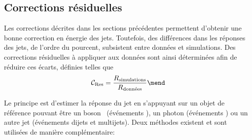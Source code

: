 \subsection{Corrections résiduelles}\label{chapter-JERC-section-CMS-subsec-residuals}
Les corrections décrites dans les sections précédentes permettent d'obtenir une bonne correction en énergie des jets.
Toutefois, des différences dans les réponses des jets, de l'ordre du pourcent, subsistent entre données et simulations.
Des corrections résiduelles à appliquer aux données sont ainsi déterminées afin de réduire ces écarts, définies telles que
\begin{equation}
\mathcal{C}_\text{Res} = \frac{R_\text{simulations}}{R_\text{données}}
\mend
\end{equation}
\par Le principe est d'estimer la réponse du jet en s'appuyant sur un objet de référence pouvant être un boson \Zboson\ (événements \Zjet), un photon (événements \Gjet) ou un autre jet (événements dijets et multijets).
Deux méthodes existent et sont utilisées de manière complémentaire:
